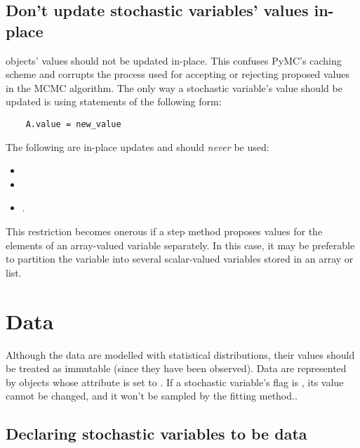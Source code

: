 \begin{center}
\begin{boxedminipage}{.9\textwidth} 
\subsection{Don't update stochastic variables' values in-place}


 objects' values should not be updated in-place. This confuses PyMC's caching scheme and corrupts the process used for accepting or rejecting proposed values in the MCMC algorithm. The only way a stochastic variable's value should be updated is using statements of the following form:
\begin{verbatim}
    A.value = new_value
\end{verbatim}
The following are in-place updates and should \emph{never} be used:
\begin{itemize}
    \item {}
    \item {}
    \item {}.
\end{itemize}

This restriction becomes onerous if a step method proposes values for the elements of an array-valued variable separately. In this case, it may be preferable to partition the variable into several scalar-valued variables stored in an array or list.
\end{boxedminipage}
\end{center}

\hypertarget{data}{}
\section{Data} \label{data}

Although the data are modelled with statistical distributions, their values should be treated as immutable (since they have been observed). Data are represented by  objects whose  attribute is set to . If a stochastic variable's  flag is , its value cannot be changed, and it won't be sampled by the fitting method..

\subsection{Declaring stochastic variables to be data}

